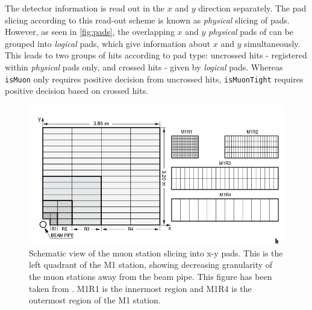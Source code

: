 
\color{black}

The detector information is read out in the $x$ and $y$ direction separately. The pad slicing according to this read-out scheme is known as \textit{physical} slicing of pads. However, as seen in \autoref{fig:pads}, the overlapping $x$ and $y$ \textit{physical} pads of can be grouped into \textit{logical} pads, which give information about $x$ and $y$ simultaneously. This leads to two groups of hits according to pad type: uncrossed hits - registered within \textit{physical} pads only, and crossed hits - given by \textit{logical} pads. Whereas \texttt{isMuon} only requires positive decision from uncrossed hits, \texttt{isMuonTight} requires positive decision based on crossed hits. 


\begin{figure}[!h]
        \centering
        \includegraphics[width = 1.0\textwidth]{figs/trimuon/pad.png}
        \caption{Schematic view of the muon station slicing into x-y pads. This is the left quadrant of the M1 station, showing decreasing granularity of the muon stations away from the beam pipe. This figure has been taken from \cite{LHCb-DP-2012-002}. M1R1 is the innermost region and M1R4 is the outermost region of the M1 station. }
        \label{fig:pads}
\end{figure}

